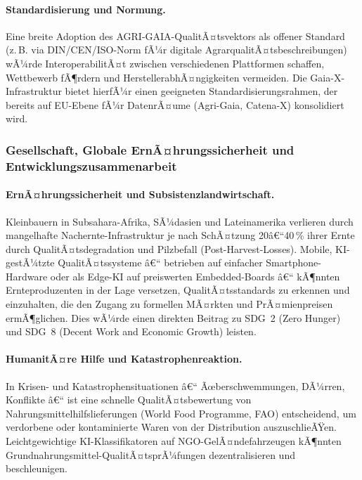 ﻿\documentclass[12pt,a4paper]{article}
\theoremstyle{plain}
\theoremstyle{definition}
\begin{document}
	\paragraph{Standardisierung und Normung.}
	Eine breite Adoption des AGRI-GAIA-QualitÃ¤tsvek\-tors als offener
	Standard (z.\,B. via DIN/CEN/ISO-Norm fÃ¼r digitale AgrarqualitÃ¤ts\-beschreibungen)
	wÃ¼rde InteroperabilitÃ¤t zwischen verschiedenen Plattformen schaffen,
	Wettbewerb fÃ¶rdern und Hersteller\-abhÃ¤ngigkeiten vermeiden.
	Die Gaia-X-Infrastruktur bietet hierfÃ¼r einen geeigneten
	Standardisierungsrahmen, der bereits auf EU-Ebene fÃ¼r
	DatenrÃ¤ume (Agri-Gaia, Catena-X) konsolidiert wird.

	\subsubsection{Gesellschaft, Globale ErnÃ¤hrungssicherheit und Entwicklungszusammenarbeit}

	\paragraph{ErnÃ¤hrungssicherheit und Subsistenzlandwirtschaft.}
	Kleinbauern in Subsahara-Afrika, SÃ¼dasien und Lateinamerika verlieren
	durch mangelhafte Nachernte-Infrastruktur je nach SchÃ¤tzung
	20â€“40\,\% ihrer Ernte durch QualitÃ¤tsdegradation und Pilzbefall
	(Post-Harvest-Losses). Mobile, KI-gestÃ¼tzte QualitÃ¤tssysteme â€“
	betrieben auf einfacher Smart\-phone-Hardware oder als Edge-KI auf
	preiswerten Embedded-Boards â€“ kÃ¶nnten Ernteproduzenten in der
	Lage versetzen, QualitÃ¤tsstandards zu erkennen und einzuhalten,
	die den Zugang zu formellen MÃ¤rkten und PrÃ¤mienpreisen ermÃ¶glichen.
	Dies wÃ¼rde einen direkten Beitrag zu SDG~2 (Zero Hunger) und SDG~8
	(Decent Work and Economic Growth) leisten.

	\paragraph{HumanitÃ¤re Hilfe und Katastrophenreaktion.}
	In Krisen- und Katastrophensituationen â€“ Ãœberschwemmungen, DÃ¼rren,
	Konflikte â€“ ist eine schnelle QualitÃ¤tsbewertung von
	Nahrungsmittelhilfslieferungen (World Food Programme, FAO)
	entscheidend, um verdorbene oder kontaminierte Waren von der
	Distribution auszuschlieÃŸen. Leichtgewichtige KI-Klassifikatoren
	auf NGO-GelÃ¤ndefahrzeugen kÃ¶nnten Grundnahrungsmittel-QualitÃ¤tsprÃ¼fungen
	dezentralisieren und beschleunigen.
\end{document}
